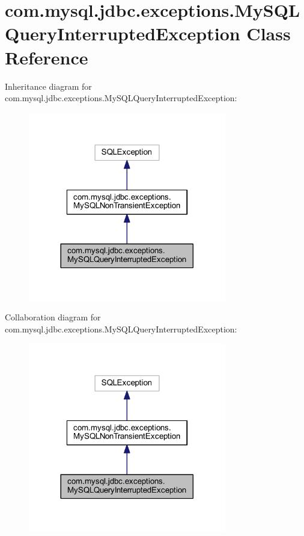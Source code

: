 \hypertarget{classcom_1_1mysql_1_1jdbc_1_1exceptions_1_1_my_s_q_l_query_interrupted_exception}{}\section{com.\+mysql.\+jdbc.\+exceptions.\+My\+S\+Q\+L\+Query\+Interrupted\+Exception Class Reference}
\label{classcom_1_1mysql_1_1jdbc_1_1exceptions_1_1_my_s_q_l_query_interrupted_exception}


Inheritance diagram for com.\+mysql.\+jdbc.\+exceptions.\+My\+S\+Q\+L\+Query\+Interrupted\+Exception\+:
\nopagebreak
\begin{figure}[H]
\begin{center}
\leavevmode
\includegraphics[width=245pt]{classcom_1_1mysql_1_1jdbc_1_1exceptions_1_1_my_s_q_l_query_interrupted_exception__inherit__graph}
\end{center}
\end{figure}


Collaboration diagram for com.\+mysql.\+jdbc.\+exceptions.\+My\+S\+Q\+L\+Query\+Interrupted\+Exception\+:
\nopagebreak
\begin{figure}[H]
\begin{center}
\leavevmode
\includegraphics[width=245pt]{classcom_1_1mysql_1_1jdbc_1_1exceptions_1_1_my_s_q_l_query_interrupted_exception__coll__graph}
\end{center}
\end{figure}
